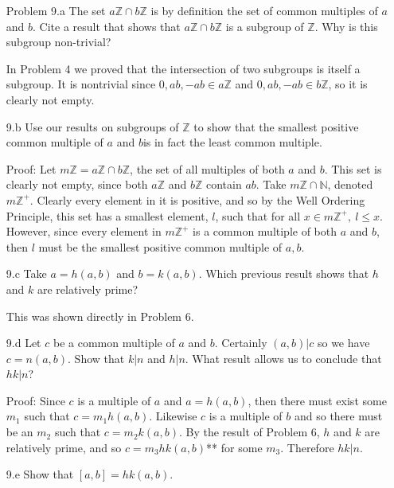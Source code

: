 \documentclass[letterpaper]{article}
\newcommand{\Integers}{\mathbb{Z}}
\newcommand{\Naturals}{\mathbb{N}}
\begin{document}
\begin{itemize}
      \item[Problem 9.a] The set \(a\Integers \cap b\Integers\) is by definition the set of common multiples of \(a\) and \(b\). Cite a result that shows that \(a\Integers \cap b\Integers\) is a subgroup of \(\Integers\). Why is this subgroup non-trivial?

            In Problem 4 we proved that the intersection of two subgroups is itself a subgroup. It is nontrivial since \(0, ab, -ab \in a\Integers\) and \(0, ab, -ab \in b\Integers\), so it is clearly not empty.

      \item[9.b] Use our results on subgroups of \(\Integers\) to show that the smallest positive common multiple of \(a\) and \(b\)is in fact the least common multiple.

            Proof: Let \(m\Integers = a\Integers \cap b\Integers\), the set of all multiples of both \(a\) and \(b\). This set is clearly not empty, since both \(a\Integers\) and \(b\Integers\) contain \(ab\). Take \(m\Integers \cap \Naturals\), denoted \(m\Integers^+\). Clearly every element in it is positive, and so by the Well Ordering Principle, this set has a smallest element, \(l\), such that for all \(x \in m\Integers^+,\ l \leq x\). However, since every element in \(m\Integers^+\) is a common multiple of both \(a\) and \(b\), then \(l\) must be the smallest positive common multiple of \(a, b\).

      \item[9.c] Take \(a = h(a, b)\) and \(b = k(a, b)\). Which previous result shows that \(h\) and \(k\) are relatively prime?

            This was shown directly in Problem 6.

      \item[9.d] Let \(c\) be a common multiple of \(a\) and \(b\). Certainly \((a, b)|c\) so we have \(c = n(a, b)\). Show that \(k | n\) and \(h | n\). What result allows us to conclude that \(hk | n\)?

            Proof: Since \(c\) is a multiple of \(a\) and \(a = h(a,b)\), then there must exist some \(m_1\) such that \(c = m_1h(a,b)\). Likewise \(c\) is a multiple of \(b\) and so there must be an \(m_2\) such that \(c = m_2k(a,b)\). By the result of Problem 6, \(h\) and \(k\) are relatively prime, and so \(c = m_3hk(a,b)\)** for some \(m_3\). Therefore \(hk | n\).

      \item[9.e] Show that \([a, b] = hk(a, b)\).


\end{itemize}
\end{document}
